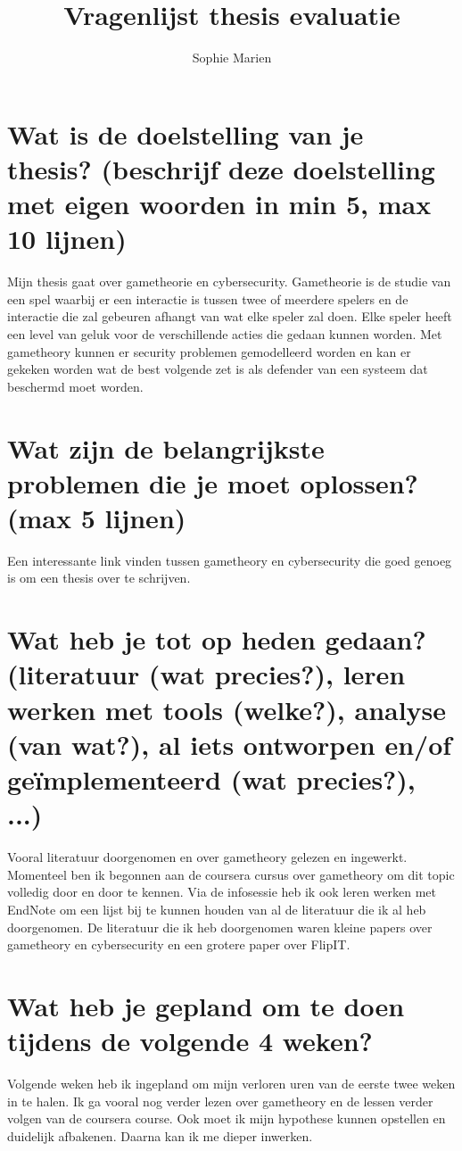 \documentclass[a4paper, 11pt]{article}
\begin{document}
\begin{titlepage}
\title{Vragenlijst thesis evaluatie}
\author{Sophie Marien}
\end{titlepage}

\maketitle

\section{Wat is de doelstelling van je thesis? (beschrijf deze doelstelling met eigen woorden in min 5, max 10 lijnen)}
Mijn thesis gaat over gametheorie en cybersecurity. Gametheorie is de studie van een spel waarbij er een interactie is tussen twee of meerdere spelers en de interactie die zal gebeuren afhangt van wat elke speler zal doen. Elke speler heeft een level van geluk voor de verschillende acties die gedaan kunnen worden. Met gametheory kunnen er security problemen gemodelleerd worden en kan er gekeken worden wat de best volgende zet is als defender van een systeem dat beschermd moet worden.


\section{Wat zijn de belangrijkste problemen die je moet oplossen? (max 5 lijnen)}
Een interessante link vinden tussen gametheory en cybersecurity die goed genoeg is om een thesis over te schrijven.
\section{Wat heb je tot op heden gedaan? (literatuur (wat precies?), leren werken met tools (welke?), analyse (van wat?), al iets ontworpen en/of geïmplementeerd (wat precies?), ...)}
Vooral literatuur doorgenomen en over gametheory gelezen en ingewerkt. Momenteel ben ik begonnen aan de coursera cursus over gametheory om dit topic volledig door en door te kennen. Via de infosessie heb ik ook leren werken met EndNote om een lijst bij te kunnen houden van al de literatuur die ik al heb doorgenomen. De literatuur die ik heb doorgenomen waren kleine papers over gametheory en cybersecurity en een grotere paper over FlipIT.
\section{Wat heb je gepland om te doen tijdens de volgende 4 weken?}
Volgende weken heb ik ingepland om mijn verloren uren van de eerste twee weken in te halen. Ik ga vooral nog verder lezen over gametheory en de lessen verder volgen van de coursera course. Ook moet ik mijn hypothese kunnen opstellen en duidelijk afbakenen. Daarna kan ik me dieper inwerken. 
\end{document}

